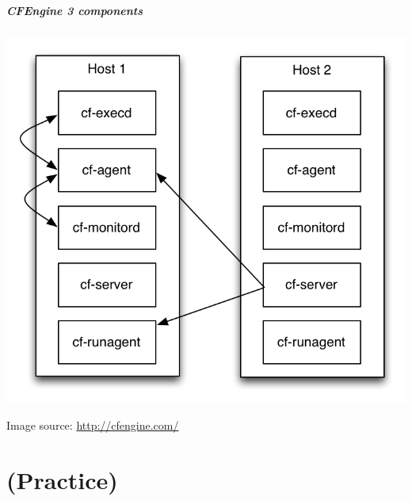 \documentclass[english,serif,mathserif,usenames,dvipsnames]{beamer}
\begin{document}
\begin{frame}
  \frametitle{CFEngine 3 components}
  \begin{center}
    \includegraphics[height=0.8\textheight]{components-overview.png}

    {\footnotesize Image source: \url{http://cfengine.com/}}
  \end{center}
\end{frame}






\part{(Practice)}
\end{document}
